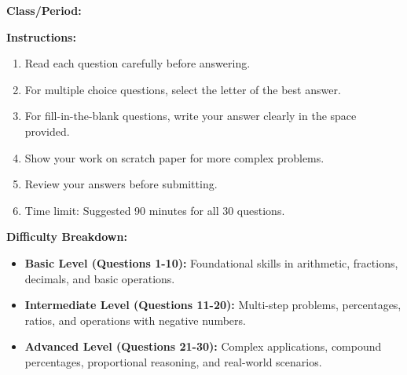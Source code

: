 \documentclass[12pt]{article}
\begin{document}
\noindent\textbf{Class/Period:} \underline{\hspace{8cm}}

\vspace{1cm}

\noindent\textbf{Instructions:}
\begin{enumerate}
    \item Read each question carefully before answering.
    \item For multiple choice questions, select the letter of the best answer.
    \item For fill-in-the-blank questions, write your answer clearly in the space provided.
    \item Show your work on scratch paper for more complex problems.
    \item Review your answers before submitting.
    \item Time limit: Suggested 90 minutes for all 30 questions.
\end{enumerate}

\vspace{1cm}

\noindent\textbf{Difficulty Breakdown:}
\begin{itemize}
    \item \textbf{Basic Level (Questions 1-10):} Foundational skills in arithmetic, fractions, decimals, and basic operations.
    \item \textbf{Intermediate Level (Questions 11-20):} Multi-step problems, percentages, ratios, and operations with negative numbers.
    \item \textbf{Advanced Level (Questions 21-30):} Complex applications, compound percentages, proportional reasoning, and real-world scenarios.
\end{itemize}
\end{document}
